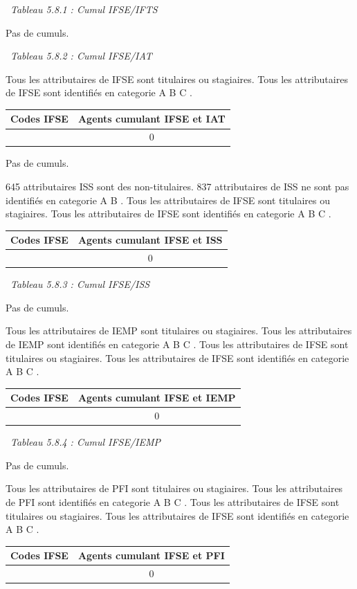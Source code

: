 ~\emph{Tableau 5.8.1 : Cumul IFSE/IFTS}

Pas de cumuls.

~\emph{Tableau 5.8.2 : Cumul IFSE/IAT}

Tous les attributaires de IFSE sont titulaires ou stagiaires. Tous les
attributaires de IFSE sont identifiés en categorie A B C .

\begin{longtable}[]{@{}cc@{}}
\toprule
Codes IFSE & Agents cumulant IFSE et IAT\tabularnewline
\midrule
\endhead
& 0\tabularnewline
\bottomrule
\end{longtable}

Pas de cumuls.

645 attributaires ISS sont des non-titulaires. 837 attributaires de ISS
ne sont pas identifiés en categorie A B . Tous les attributaires de IFSE
sont titulaires ou stagiaires. Tous les attributaires de IFSE sont
identifiés en categorie A B C .

\begin{longtable}[]{@{}cc@{}}
\toprule
Codes IFSE & Agents cumulant IFSE et ISS\tabularnewline
\midrule
\endhead
& 0\tabularnewline
\bottomrule
\end{longtable}

~\emph{Tableau 5.8.3 : Cumul IFSE/ISS}

Pas de cumuls.

Tous les attributaires de IEMP sont titulaires ou stagiaires. Tous les
attributaires de IEMP sont identifiés en categorie A B C . Tous les
attributaires de IFSE sont titulaires ou stagiaires. Tous les
attributaires de IFSE sont identifiés en categorie A B C .

\begin{longtable}[]{@{}cc@{}}
\toprule
Codes IFSE & Agents cumulant IFSE et IEMP\tabularnewline
\midrule
\endhead
& 0\tabularnewline
\bottomrule
\end{longtable}

~\emph{Tableau 5.8.4 : Cumul IFSE/IEMP}

Pas de cumuls.

Tous les attributaires de PFI sont titulaires ou stagiaires. Tous les
attributaires de PFI sont identifiés en categorie A B C . Tous les
attributaires de IFSE sont titulaires ou stagiaires. Tous les
attributaires de IFSE sont identifiés en categorie A B C .

\begin{longtable}[]{@{}cc@{}}
\toprule
Codes IFSE & Agents cumulant IFSE et PFI\tabularnewline
\midrule
\endhead
& 0\tabularnewline
\bottomrule
\end{longtable}

